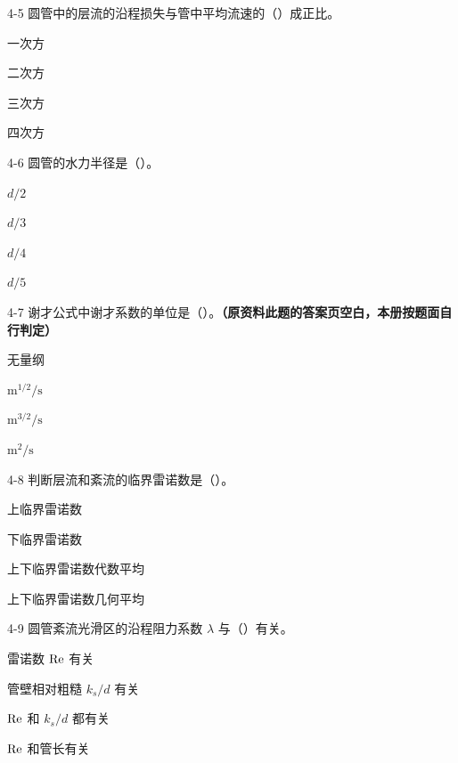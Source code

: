 \begin{ti}
\item[4-5] 圆管中的层流的沿程损失与管中平均流速的（\quad）成正比。
\begin{choices}
\item 一次方
\item 二次方
\item 三次方
\item 四次方
\end{choices}

\item[4-6] 圆管的水力半径是（\quad）。
\begin{choices}
\item $d/2$
\item $d/3$
\item $d/4$
\item $d/5$
\end{choices}

\item[4-7] 谢才公式中谢才系数的单位是（\quad）。\textbf{（原资料此题的答案页空白，本册按题面自行判定）}
\begin{choices}
\item 无量纲
\item $\mathrm{m^{1/2}/s}$
\item $\mathrm{m^{3/2}/s}$
\item $\mathrm{m^2/s}$
\end{choices}

\item[4-8] 判断层流和紊流的临界雷诺数是（\quad）。
\begin{choices}
\item 上临界雷诺数
\item 下临界雷诺数
\item 上下临界雷诺数代数平均
\item 上下临界雷诺数几何平均
\end{choices}

\item[4-9] 圆管紊流光滑区的沿程阻力系数 $\lambda$ 与（\quad）有关。
\begin{choices}
\item 雷诺数 $\mathrm{Re}$ 有关
\item 管壁相对粗糙 $k_s/d$ 有关
\item $\mathrm{Re}$ 和 $k_s/d$ 都有关
\item $\mathrm{Re}$ 和管长有关
\end{choices}


\end{ti}
